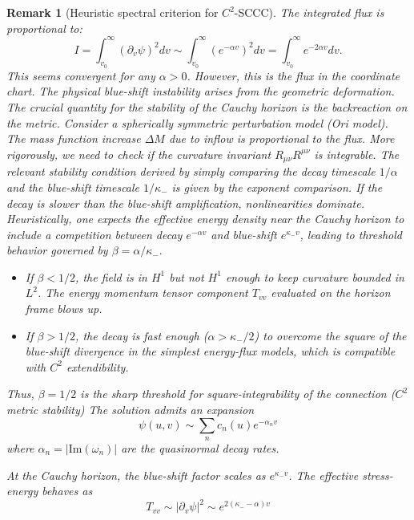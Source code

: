 \documentclass[12pt,a4paper]{article}
\newtheorem{remark}[theorem]{Remark}
\begin{document}
\begin{remark}[Heuristic spectral criterion for $C^2$-SCCC]
The integrated flux is proportional to:
\begin{equation}
I = \int_{v_0}^{\infty} (\partial_v \psi)^2 dv \sim \int_{v_0}^{\infty} (e^{-\alpha v})^2 dv = \int_{v_0}^{\infty} e^{-2\alpha v} dv.
\end{equation}
This seems convergent for any $\alpha > 0$. However, this is the flux in the coordinate chart. The physical blue-shift instability arises from the geometric deformation. The crucial quantity for the stability of the Cauchy horizon is the backreaction on the metric. 
Consider a spherically symmetric perturbation model (Ori model). The mass function increase $\Delta M$ due to inflow is proportional to the flux.
More rigorously, we need to check if the curvature invariant $R_{\mu\nu}R^{\mu\nu}$ is integrable.
The relevant stability condition derived by simply comparing the decay timescale $1/\alpha$ and the blue-shift timescale $1/\kappa_-$ is given by the exponent comparison.
If the decay is slower than the blue-shift amplification, nonlinearities dominate.
Heuristically, one expects the effective energy density near the Cauchy horizon to include a competition between decay $e^{-\alpha v}$ and blue-shift $e^{\kappa_- v}$, leading to threshold behavior governed by $\beta = \alpha/\kappa_-.$
\begin{itemize}
    \item If $\beta < 1/2$, the field is in $H^1$ but not $H^1$ enough to keep curvature bounded in $L^2$. The energy momentum tensor component $T_{vv}$ evaluated on the horizon frame blows up.
    \item If $\beta > 1/2$, the decay is fast enough ($\alpha > \kappa_-/2$) to overcome the square of the blue-shift divergence in the simplest energy-flux models, which is compatible with $C^2$ extendibility.
\end{itemize}
Thus, $\beta = 1/2$ is the sharp threshold for square-integrability of the connection ($C^2$ metric stability)
The solution admits an expansion
\begin{equation}
\psi(u, v) \sim \sum_n c_n(u) e^{-\alpha_n v}
\end{equation}
where $\alpha_n = |\text{Im}(\omega_n)|$ are the quasinormal decay rates.

At the Cauchy horizon, the blue-shift factor scales as $e^{\kappa_- v}$. The effective stress-energy behaves as
\begin{equation}
T_{vv} \sim |\partial_v \psi|^2 \sim e^{2(\kappa_- - \alpha)v}
\end{equation}


\end{remark}
\end{document}
